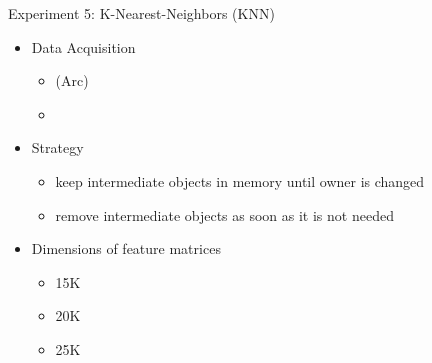 \documentclass[9pt]{beamer}
\begin{document}

\begin{frame}[fragile]{Experiment 5: K-Nearest-Neighbors (KNN)}

    \begin{itemize}
        \item Data Acquisition
        \begin{itemize}
            \item {} (Arc)
            \item {}
        \end{itemize} 
        \vspace{0.5cm}
        \item Strategy
        \begin{itemize}
            \item keep intermediate objects in memory until owner is changed
            \item remove intermediate objects as soon as it is not needed
        \end{itemize}
        \vspace{0.5cm}
        \item Dimensions of feature matrices
        \begin{itemize}
            \item 15K
            \item 20K
            \item 25K
        \end{itemize} 
    \end{itemize}
\end{frame}

\end{document}
